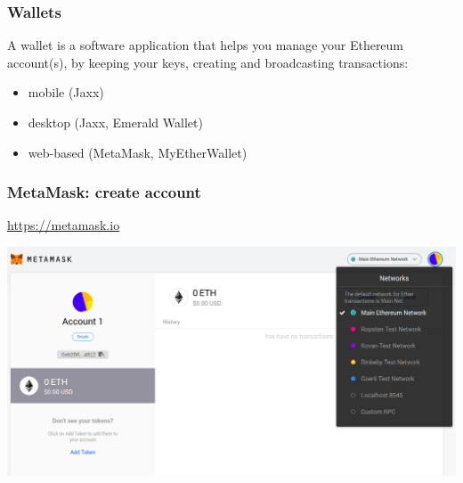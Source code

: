 \documentclass[11pt]{beamer}  %
\begin{document}
\begin{frame}\frametitle{Wallets}

  \begin{greenbox}{}
    A wallet is a
    software application that helps you manage your Ethereum account(s),
    by keeping your keys, creating and broadcasting transactions:
    \begin{itemize}
    \item mobile (Jaxx)
    \item desktop (Jaxx, Emerald Wallet)
    \item web-based (MetaMask, MyEtherWallet)
    \end{itemize}
  \end{greenbox}

\end{frame}

\begin{frame}\frametitle{MetaMask: create account}

  \url{https://metamask.io}
  \begin{center}
    \includegraphics[width=\textwidth,clip=false]{pictures/metamask-account.png}
  \end{center}

\end{frame}
\end{document}
